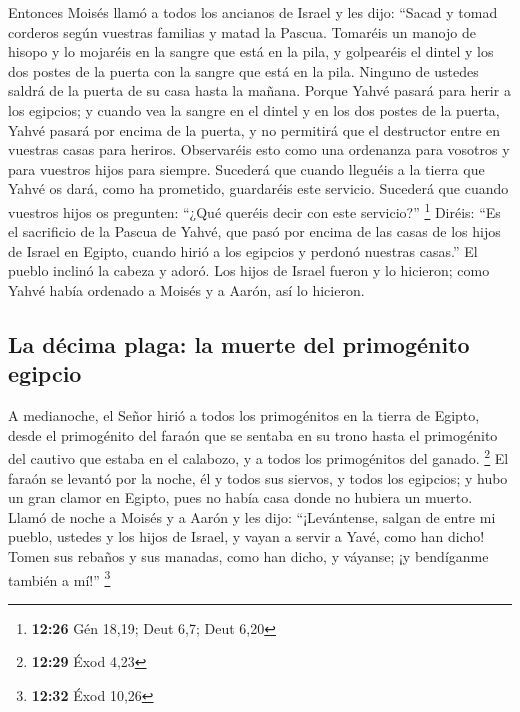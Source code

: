  Entonces Moisés llamó a todos los ancianos de Israel y
les dijo: ``Sacad y tomad corderos según vuestras familias y matad la
Pascua.  Tomaréis un manojo de hisopo y lo mojaréis en la
sangre que está en la pila, y golpearéis el dintel y los dos postes de
la puerta con la sangre que está en la pila. Ninguno de ustedes saldrá
de la puerta de su casa hasta la mañana.  Porque Yahvé
pasará para herir a los egipcios; y cuando vea la sangre en el dintel y
en los dos postes de la puerta, Yahvé pasará por encima de la puerta, y
no permitirá que el destructor entre en vuestras casas para heriros.
 Observaréis esto como una ordenanza para vosotros y para
vuestros hijos para siempre.  Sucederá que cuando
lleguéis a la tierra que Yahvé os dará, como ha prometido, guardaréis
este servicio.  Sucederá que cuando vuestros hijos os
pregunten: ``¿Qué queréis decir con este servicio?'' \footnote{\textbf{12:26}
  Gén 18,19; Deut 6,7; Deut 6,20}  Diréis: ``Es el
sacrificio de la Pascua de Yahvé, que pasó por encima de las casas de
los hijos de Israel en Egipto, cuando hirió a los egipcios y perdonó
nuestras casas.'' El pueblo inclinó la cabeza y adoró. 
Los hijos de Israel fueron y lo hicieron; como Yahvé había ordenado a
Moisés y a Aarón, así lo hicieron.

\hypertarget{la-duxe9cima-plaga-la-muerte-del-primoguxe9nito-egipcio}{%
\subsection{La décima plaga: la muerte del primogénito
egipcio}\label{la-duxe9cima-plaga-la-muerte-del-primoguxe9nito-egipcio}}

 A medianoche, el Señor hirió a todos los primogénitos en
la tierra de Egipto, desde el primogénito del faraón que se sentaba en
su trono hasta el primogénito del cautivo que estaba en el calabozo, y a
todos los primogénitos del ganado. \footnote{\textbf{12:29} Éxod 4,23}
 El faraón se levantó por la noche, él y todos sus
siervos, y todos los egipcios; y hubo un gran clamor en Egipto, pues no
había casa donde no hubiera un muerto.  Llamó de noche a
Moisés y a Aarón y les dijo: ``¡Levántense, salgan de entre mi pueblo,
ustedes y los hijos de Israel, y vayan a servir a Yavé, como han dicho!
 Tomen sus rebaños y sus manadas, como han dicho, y
váyanse; ¡y bendíganme también a mí!'' \footnote{\textbf{12:32} Éxod
  10,26}


